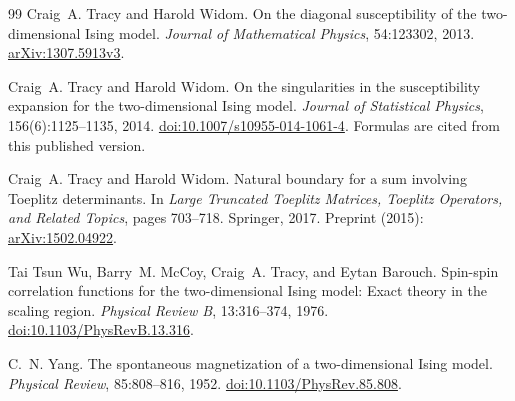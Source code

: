 \documentclass[11pt]{article}
\numberwithin{equation}{section}
\theoremstyle{definition}
\begin{document}
\begin{thebibliography}{99}
Craig~A. Tracy and Harold Widom.
\newblock On the diagonal susceptibility of the two-dimensional {Ising} model.
\newblock \emph{Journal of Mathematical Physics}, 54:123302, 2013.
\newblock \href{https://arxiv.org/abs/1307.5913v3}{arXiv:1307.5913v3}.

Craig~A. Tracy and Harold Widom.
\newblock On the singularities in the susceptibility expansion for the
two-dimensional {Ising} model.
\newblock \emph{Journal of Statistical Physics}, 156(6):1125--1135, 2014.
\newblock \href{https://doi.org/10.1007/s10955-014-1061-4}{doi:10.1007/s10955-014-1061-4}.
\newblock Formulas are cited from this published version.

Craig~A. Tracy and Harold Widom.
\newblock Natural boundary for a sum involving {Toeplitz} determinants.
\newblock In \emph{Large Truncated Toeplitz Matrices, Toeplitz Operators,
and Related Topics}, pages 703--718. Springer, 2017.
\newblock Preprint (2015):
\href{https://arxiv.org/abs/1502.04922}{arXiv:1502.04922}.

Tai Tsun Wu, Barry~M. McCoy, Craig~A. Tracy, and Eytan Barouch.
\newblock Spin-spin correlation functions for the two-dimensional {Ising}
model: Exact theory in the scaling region.
\newblock \emph{Physical Review B}, 13:316--374, 1976.
\newblock \href{https://doi.org/10.1103/PhysRevB.13.316}{doi:10.1103/PhysRevB.13.316}.

C.~N. Yang.
\newblock The spontaneous magnetization of a two-dimensional {Ising} model.
\newblock \emph{Physical Review}, 85:808--816, 1952.
\newblock \href{https://doi.org/10.1103/PhysRev.85.808}{doi:10.1103/PhysRev.85.808}.

\end{thebibliography}
\end{document}
